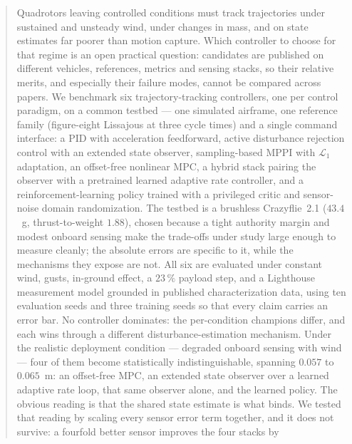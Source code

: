 
\begin{abstract}
Quadrotors leaving controlled conditions must track trajectories under sustained and
unsteady wind, under changes in mass, and on state estimates far poorer than motion
capture. Which controller to choose for that regime is an open practical question:
candidates are published on different vehicles, references, metrics and sensing stacks,
so their relative merits, and especially their failure modes, cannot be compared across
papers. We benchmark six trajectory-tracking controllers, one per control paradigm, on a
common testbed --- one simulated airframe, one reference family
(figure-eight Lissajous at three cycle times) and a single command interface: a PID with
acceleration feedforward, active disturbance rejection control with an extended state
observer, sampling-based MPPI with $\mathcal{L}_1$ adaptation, an offset-free nonlinear
MPC, a hybrid stack pairing the observer with a pretrained learned adaptive rate
controller, and a reinforcement-learning policy trained with a privileged critic and
sensor-noise domain randomization. The testbed is a brushless Crazyflie~2.1 ($43.4$~g,
thrust-to-weight $1.88$), chosen because a tight authority margin and modest onboard
sensing make the trade-offs under study large enough to measure cleanly; the absolute
errors are specific to it, while the mechanisms they expose are not. All six are
evaluated under constant wind, gusts,
in-ground effect, a $23\,\%$ payload step, and a Lighthouse measurement model grounded
in published characterization data, using ten evaluation seeds and three training seeds
so that every claim carries an error bar. No controller dominates: the per-condition
champions differ, and each wins through a different disturbance-estimation mechanism.
Under the realistic deployment condition --- degraded onboard sensing with wind --- four
of them become statistically indistinguishable, spanning $0.057$ to $0.065$~m: an
offset-free MPC, an extended state observer over a learned adaptive rate loop, that same
observer alone, and the learned policy. The obvious reading is that the shared state
estimate is what binds. We tested that reading by scaling every sensor error term
together, and it does not survive: a fourfold better sensor improves the four stacks by

\end{abstract}
